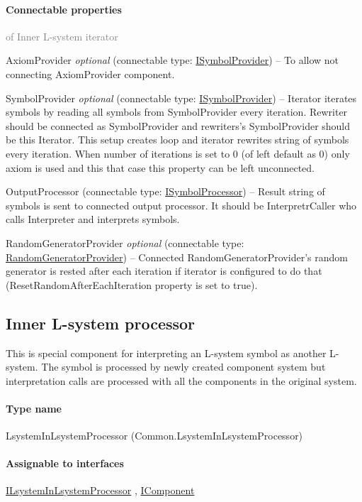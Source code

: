 	\paragraph{Connectable properties}\textcolor{gray}{of Inner L-system iterator}
	\begin{description*}
		\item[AxiomProvider]
 \textit{optional} 		(connectable type:  \hyperref[Malsys.Processing.Components.ISymbolProvider]{ISymbolProvider})
			-- To allow not connecting AxiomProvider component.
		\item[SymbolProvider]
 \textit{optional} 		(connectable type:  \hyperref[Malsys.Processing.Components.ISymbolProvider]{ISymbolProvider})
			-- Iterator iterates symbols by reading all symbols from SymbolProvider every iteration.
            Rewriter should be connected as SymbolProvider and rewriters's SymbolProvider should be this Iterator.
            This setup creates loop and iterator rewrites string of symbols every iteration.
            When number of iterations is set to 0 (of left default as 0) only axiom is used and this that case this property can be left unconnected.
		\item[OutputProcessor]
		(connectable type:  \hyperref[Malsys.Processing.Components.ISymbolProcessor]{ISymbolProcessor})
			-- Result string of symbols is sent to connected output processor.
            It should be InterpretrCaller who calls Interpreter and interprets symbols.
		\item[RandomGeneratorProvider]
 \textit{optional} 		(connectable type:  \hyperref[Malsys.Processing.Components.Common.RandomGeneratorProvider]{RandomGeneratorProvider})
			-- Connected RandomGeneratorProvider's random generator is rested after each iteration
            if iterator is configured to do that (ResetRandomAfterEachIteration property is set to true).
	\end{description*}
	


\subsection{Inner L-system processor}
\label{Malsys.Processing.Components.Common.LsystemInLsystemProcessor}
This is special component for interpreting an L-system symbol as another L-system.
            The symbol is processed by newly created component system but interpretation calls are processed with all the
            components in the original system.\paragraph{Type name}
LsystemInLsystemProcessor (Common.LsystemInLsystemProcessor) 	\paragraph{Assignable to interfaces}
		\hyperref[Malsys.Processing.Components.Common.ILsystemInLsystemProcessor]{ILsystemInLsystemProcessor}%
, 		\hyperref[Malsys.Processing.Components.IComponent]{IComponent}%
	
